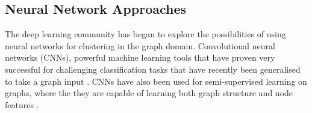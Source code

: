 \documentclass{report}
\begin{document}
	
	
	\subsection{Neural Network Approaches}
	The deep learning community has began to explore the possibilities of using neural networks for clustering in the graph domain. Convolutional neural networks (CNNs), powerful machine learning tools that have proven very successful for challenging classification tasks that have recently been generalised to take a graph input \cite{defferrard2016convolutional}. 
	CNNs have also been used for semi-supervised learning on graphs, where the they are capable of learning both graph structure and node features \cite{kipf2016semi}. 
	
\end{document}
